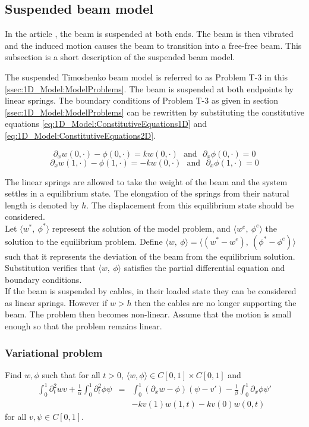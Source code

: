 \documentclass[../../main.tex]{subfiles}
\begin{document}
\subsection{Suspended beam model}
In the article \cite{SP06}, the beam is suspended at both ends. The beam is then vibrated and the induced motion causes the beam to transition into a free-free beam. This subsection is a short description of the suspended beam model.

The suspended Timoshenko beam model is referred to as Problem T-3 in this \ref{ssec:1D_Model:ModelProblems}. The beam is suspended at both endpoints by linear springs. The boundary conditions of Problem T-3 as given in section \ref{ssec:1D_Model:ModelProblems} can be rewritten by substituting the constitutive equations \eqref{eq:1D_Model:ConstitutiveEquations1D} and \eqref{eq:1D_Model:ConstitutiveEquations2D}.

	\[\partial_{x}w(0,\cdot) - \phi(0,\cdot) = kw(0,\cdot)  \ \ \ \textrm{and} \ \ \ \partial_{x}\phi(0,\cdot) = 0\]
	\[\partial_{x}w(1,\cdot) - \phi(1,\cdot) = -kw(0,\cdot) \ \  \ \textrm{and} \ \ \ \partial_{x}\phi(1,\cdot) = 0\]

The linear springs are allowed to take the weight of the beam and the system settles in a equilibrium state. The elongation of the springs from their natural length is denoted by $h$. The displacement from this equilibrium state should be considered.\\ 

Let $\langle w^*, \ \phi^*\rangle$ represent the solution of the model problem, and $\langle w^e, \ \phi^e \rangle$ the solution to the equilibrium problem. Define $\langle w, \ \phi\rangle = \langle(w^*-w^e), \ (\phi^*-\phi^e)\rangle$ such that it represents the deviation of the beam from the equilibrium solution. Substitution verifies that $\langle w, \ \phi\rangle$ satisfies the partial differential equation and boundary conditions.\\

If the beam is suspended by cables, in their loaded state they can be considered as linear springs. However if $w > h$ then the cables are no longer supporting the beam. The problem then becomes non-linear. Assume that the motion is small enough so that the problem remains linear.

\subsubsection{Variational problem}
Find $w,\phi$ such that for all $t>0$, $\langle w,\phi \rangle \in C[0,1]\times C[0,1]$ and
\begin{eqnarray*}
	\int_{0}^{1} \partial_{t}^{2} wv + \frac{1}{\alpha}\int_{0}^{1}  \partial_{t}^{2} \phi \psi &=& \int_{0}^{1} (\partial_{x}w - \phi)(\psi -v')  - \frac{1}{\beta}\int_{0}^{1}\partial_{x}\phi \psi'\\
	& & - kv(1)w(1,t) - kv(0)w(0,t)
\end{eqnarray*} for all $v,\psi \in C[0,1]$.\\
\end{document}
